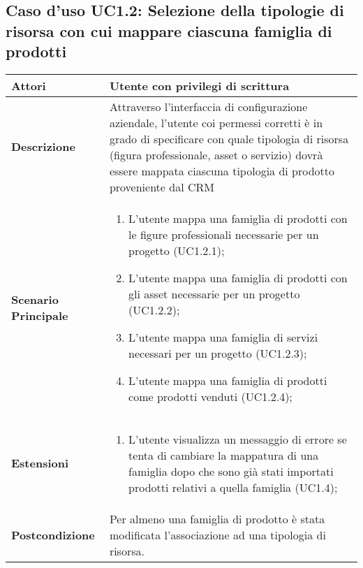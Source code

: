 	\subsection{Caso d'uso UC1.2: Selezione della tipologie di risorsa con cui mappare ciascuna famiglia di prodotti}
	\begin{longtable}{ | p{2.7cm} | p{12cm} |}
		\hline \textbf{Attori} & Utente con privilegi di scrittura\\ 
		\hline \textbf{Descrizione} & Attraverso l’interfaccia di configurazione aziendale, l’utente coi permessi corretti è in grado di specificare con quale tipologia di risorsa (figura professionale, asset o servizio) dovrà essere mappata ciascuna tipologia di prodotto proveniente dal CRM\\ 
		\hline \textbf{Scenario Principale} & \begin{enumerate}
			\item L’utente mappa una famiglia di prodotti con le figure professionali necessarie per un progetto  (UC1.2.1);
			\item L’utente mappa una famiglia di prodotti con gli asset necessarie per un progetto  (UC1.2.2);
			\item L’utente mappa una famiglia di servizi necessari per un progetto  (UC1.2.3);
			\item L’utente mappa una famiglia di prodotti come prodotti venduti (UC1.2.4);
			
		\end{enumerate}
		\\ 
		\hline \textbf{Estensioni} & \begin{enumerate}
			\item L’utente visualizza un messaggio di errore se tenta di cambiare la mappatura di una famiglia dopo che sono già stati importati prodotti relativi a quella famiglia  (UC1.4);
			
		\end{enumerate}
		\\ 
		\hline \textbf{Postcondizione} & Per almeno una famiglia di prodotto è stata modificata l’associazione ad una tipologia di risorsa. \\ 
		\hline 
	\end{longtable}
	
	\hypertarget{UC1.3}{}
